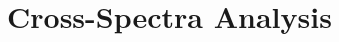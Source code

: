 \documentclass[../../thesis.tex]{subfiles}
\begin{document}
\chapter{Cross-Spectra Analysis}
\minitoc
\end{document}
